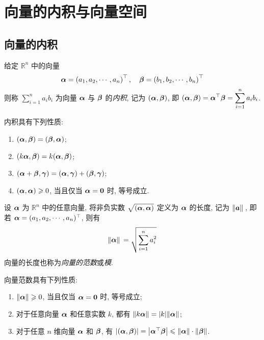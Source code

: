 \section{向量的内积与向量空间}

\subsection{向量的内积}

\begin{definition}[向量的内积]
    给定 $ \mathbb{R}^{n} $ 中的向量
    $$\vb*{\alpha}=\left(a_{1}, a_{2}, \cdots, a_{n}\right)^{\top}, \quad \vb*{\beta}=\left(b_{1}, b_{2}, \cdots, b_{n}\right)^{\top}$$
    则称 $\displaystyle \sum_{i=1}^{n} a_{i} b_{i} $ 为向量 $ \vb*{\alpha} $ 与 $ \vb*{\beta} $ 的\textit{内积}, 记为 $ (\vb*{\alpha}, \vb*{\beta}) $, 即 $ \displaystyle(\vb*{\alpha}, \vb*{\beta})=\vb*{\alpha}^{\top} \vb*{\beta}=\sum_{i=1}^{n} a_{i} b_{i} $.
\end{definition}

内积具有下列性质:
\begin{enumerate}[label=(\arabic{*})]
    \item $(\vb*{\alpha}, \vb*{\beta})=(\vb*{\beta}, \vb*{\alpha}) $;
    \item $(k \vb*{\alpha}, \vb*{\beta})=k(\vb*{\alpha}, \vb*{\beta}) $;
    \item $(\vb*{\alpha}+\vb*{\beta}, \vb*{\gamma})=(\vb*{\alpha}, \vb*{\gamma})+(\vb*{\beta}, \vb*{\gamma}) $;
    \item $(\vb*{\alpha}, \vb*{\alpha}) \geqslant 0 $, 当且仅当 $ \vb*{\alpha}=\vb*{0} $ 时, 等号成立.
\end{enumerate}

\begin{definition}[向量的范数]
    设 $\vb*{\alpha}$ 为 $\mathbb{R}^n$ 中的任意向量, 将非负实数 $\sqrt{(\vb*{\alpha},\vb*{\alpha})}$ 定义为 $\vb*{\alpha}$ 的长度, 记为 $\norm*{\vb*{a}}$, 即若 $\vb*{\alpha}=(a_1,a_2,\cdots,a_n)^\top$, 则有 $$\norm*{\vb*{\alpha}}=\sqrt{\displaystyle\sum_{i=1}^{n}a_i^2}$$
    向量的长度也称为\textit{向量的范数}或\textit{模}.
\end{definition}

向量范数具有下列性质:
\begin{enumerate}[label=(\arabic{*})]
    \item $\|\vb*{\alpha}\| \geqslant 0  $, 当且仅当 $ \vb*{\alpha}=\vb*{0} $ 时, 等号成立;
    \item 对于任意向量 $ \vb*{\alpha} $ 和任意实数 $ k $, 都有 $ \|k \vb*{\alpha}\|=|k|\|\vb*{\alpha}\| $;
    \item 对于任意 $ n $ 维向量 $ \vb*{\alpha} $ 和 $ \vb*{\beta} $, 有 $ |(\vb*{\alpha}, \vb*{\beta})|=\left|\vb*{\alpha}^{\top} \vb*{\beta}\right| \leqslant\|\vb*{\alpha}\| \cdot\|\vb*{\beta}\|$.
\end{enumerate}

